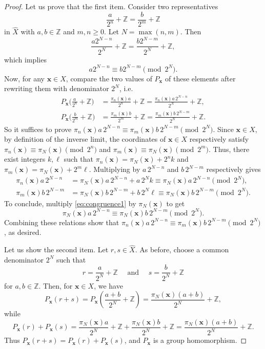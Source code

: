 \documentclass[12pt,reqno]{article}
\newcommand{\Z}{\mathbb{Z}}
\begin{document}
\begin{proof}
Let us prove that the first item.  Consider two representatives 
\[
\frac{a}{2^n}+\mathbb Z=\frac{b}{2^m}+\mathbb Z
\]
in $\widehat X$ with $a,b\in\mathbb{Z}$ and $m,n\ge0$.
Let $N=\max(n,m)$.  Then
\[
\frac{a2^{N-n}}{2^N}+\mathbb Z
=\frac{b2^{N-m}}{2^N}+\mathbb Z,
\]
which implies
\begin{equation}\label{eq:congruence1}
a2^{N-n}\equiv b2^{N-m}\pmod{2^N}.
\end{equation}
Now,  for any $\mathbf{x}\in X$,  compare the two values of $P_\mathbf{x}$ of these elements after rewriting them with denominator $2^N$,  i.e.
\begin{align*}
P_\mathbf{x}\bigl(\tfrac{a}{2^n}+\mathbb{Z}\bigr)
&=
\frac{\pi_n(\mathbf{x})a}{2^n}+\mathbb Z
=
\frac{\pi_n(\mathbf{x})a\,2^{N-n}}{2^N}+\mathbb Z, \\
P_\mathbf{x}\bigl(\tfrac{b}{2^m}+\mathbb{Z}\bigr)
&=
\frac{\pi_m(\mathbf{x})b}{2^m}+\mathbb Z
=
\frac{\pi_m(\mathbf{x})b\,2^{N-m}}{2^N}+\mathbb Z.
\end{align*}
So it suffices to prove \(
\pi_n(\mathbf{x})a\,2^{N-n}\equiv \pi_m(\mathbf{x})b\,2^{N-m}\pmod{2^N}
\).
Since $\mathbf{x}\in X$, by definition of the inverse limit, the coordinates of $\mathbf{x}\in X$ respectively satisfy $\pi_n(\mathbf{x})\equiv \pi_N(\mathbf{x})\pmod{2^n}$ and $\pi_m(\mathbf{x})\equiv \pi_N(\mathbf{x})\pmod{2^m}$.
Thus,  there exist integers $k,\ell$ such that $\pi_n( \mathbf{x})=\pi_N(\mathbf{x})+2^n k$ and $\pi_m(\mathbf{x})=\pi_N(\mathbf{x})+2^m \ell$.
Multiplying by $a\, 2^{N-n}$ and $b\, 2^{N-m}$ respectively gives
\begin{align*}
\pi_n(\mathbf{x})a\,2^{N-n}&=\pi_N(\mathbf{x})a\,2^{N-n}+a\, 2^N k \equiv \pi_N(\mathbf{x})a \,2^{N-n}\pmod{2^N}, \\
\pi_m(\mathbf{x})b\,2^{N-m}&=\pi_N(\mathbf{x})b\,2^{N-m}+b\, 2^N \ell \equiv \pi_N(\mathbf{x})b\,2^{N-m}\pmod{2^N}.
\end{align*}
To conclude,  multiply \eqref{eq:congruence1} by $\pi_N(\mathbf{x})$ to get
\[
\pi_N(\mathbf{x})a\,2^{N-n}\equiv \pi_N(\mathbf{x})b\,2^{N-m}\pmod{2^N}.
\]
Combining these relations show that $\pi_n(\mathbf{x})a\,2^{N-n}\equiv \pi_m(\mathbf{x})b\,2^{N-m}\pmod{2^N}$,  as desired.


Let us show the second item. 
Let $r,s \in \widehat X$.  As before,  choose a common denominator $2^N$ such that
\[
r=\frac{a}{2^N}+\mathbb Z
\quad \text{ and } \quad
s=\frac{b}{2^N}+\mathbb Z
\]
for $a,b\in\Z$.
Then,  for $\mathbf{x}\in X$,  we have
\[
P_\mathbf{x}(r+s)
=P_\mathbf{x}\!\left(\frac{a+b}{2^N}+\mathbb Z\right)
=\frac{\pi_N(\mathbf{x})(a+b)}{2^N}+\mathbb Z,
\]
while
\[
P_\mathbf{x}(r)+P_\mathbf{x}(s)
=\frac{\pi_N(\mathbf{x})a}{2^N}+\mathbb Z
+\frac{\pi_N(\mathbf{x})b}{2^N}+\mathbb Z
=\frac{\pi_N(\mathbf{x})(a+b)}{2^N}+\mathbb Z.
\]
Thus $P_\mathbf{x}(r+s)=P_\mathbf{x}(r)+P_\mathbf{x}(s)$, and $P_\mathbf{x}$ is a group homomorphism.


\end{proof}
\end{document}
